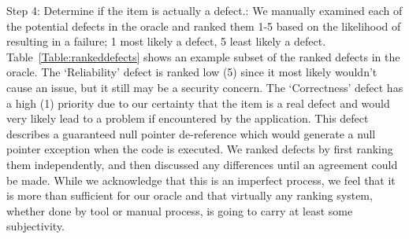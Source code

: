 \documentclass{sig-alternate}
\makeatletter
\newcommand{\todo}[1]{\textcolor{cyan}{\textbf{[#1]}}}
\newcommand{\specialcell}[2][c]{%
  \begin{tabular}[#1]{@{}l@{}}#2\end{tabular}}
\makeatother
\begin{document}
%
%
%	
%


Step 4: Determine if the item is actually a defect.: We manually examined each of the potential defects in the oracle and ranked them 1-5 based on the likelihood of resulting in a failure; 1 most likely a defect, 5 least likely a defect. Table~\ref{Table:rankeddefects} shows an example subset of the ranked defects in the oracle.  The `Reliability' defect  is ranked low (5) since it most likely wouldn't cause an issue, but it still may be a security concern. The `Correctness' defect has a high (1) priority due to our certainty that the item is a real defect and would very likely lead to a problem if encountered by the application. This defect describes a guaranteed null pointer de-reference which would generate a null pointer exception when the code is executed. We ranked defects by first ranking them independently, and then discussed any differences until an agreement could be made. While we acknowledge that this is an imperfect process, we feel that it is more than sufficient for our oracle and that virtually any ranking system, whether done by tool or manual process, is going to carry at least some subjectivity.
\end{document}
